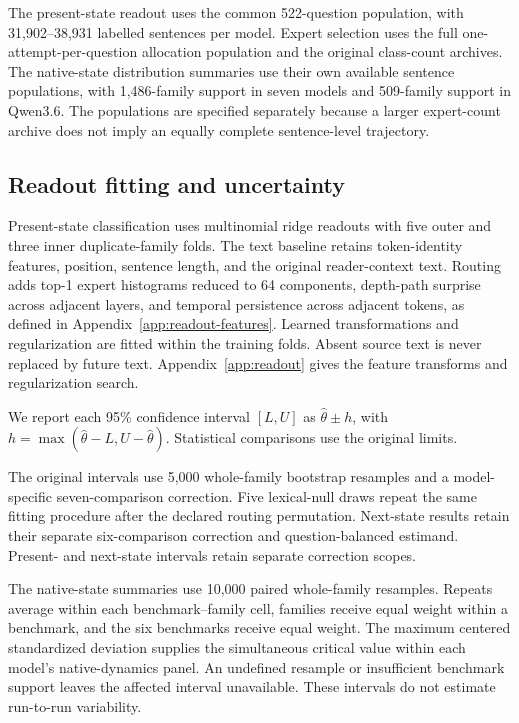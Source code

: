 The present-state readout uses the common 522-question population, with 31,902--38,931 labelled sentences per model.
%
Expert selection uses the full one-attempt-per-question allocation population and the original class-count archives.
%
The native-state distribution summaries use their own available sentence populations, with 1,486-family support in seven models and 509-family support in Qwen3.6.
%
The populations are specified separately because a larger expert-count archive does not imply an equally complete sentence-level trajectory.
%

\subsection{Readout fitting and uncertainty}

Present-state classification uses multinomial ridge readouts with five outer and three inner duplicate-family folds.
%
The text baseline retains token-identity features, position, sentence length, and the original reader-context text.
%
Routing adds top-1 expert histograms reduced to 64 components, depth-path surprise across adjacent layers, and temporal persistence across adjacent tokens, as defined in Appendix~\ref{app:readout-features}.
%
Learned transformations and regularization are fitted within the training folds.
%
Absent source text is never replaced by future text.
%
Appendix~\ref{app:readout} gives the feature transforms and regularization search.
%

We report each 95\% confidence interval $[L,U]$ as $\hat\theta\pm h$, with $h=\max(\hat\theta-L,U-\hat\theta)$.
%
Statistical comparisons use the original limits.
%

The original intervals use 5,000 whole-family bootstrap resamples and a model-specific seven-comparison correction.
%
Five lexical-null draws repeat the same fitting procedure after the declared routing permutation.
%
Next-state results retain their separate six-comparison correction and question-balanced estimand.
%
Present- and next-state intervals retain separate correction scopes.
%

The native-state summaries use 10,000 paired whole-family resamples.
%
Repeats average within each benchmark--family cell, families receive equal weight within a benchmark, and the six benchmarks receive equal weight.
%
The maximum centered standardized deviation supplies the simultaneous critical value within each model's native-dynamics panel.
%
An undefined resample or insufficient benchmark support leaves the affected interval unavailable.
%
These intervals do not estimate run-to-run variability.
%

